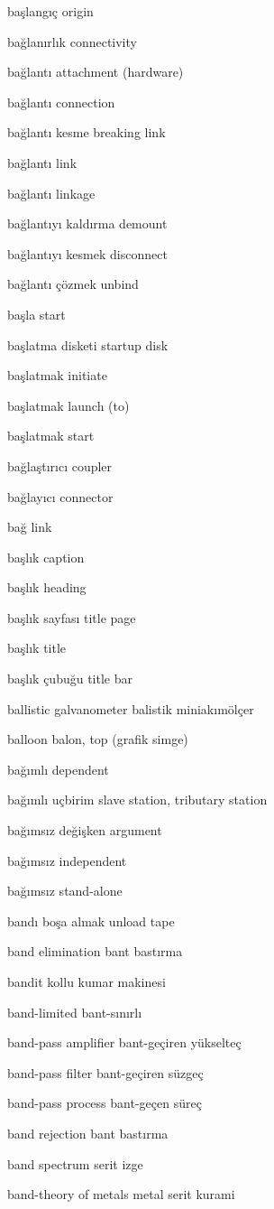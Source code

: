 \documentclass[12pt,fleqn]{article}\usepackage{../../common}
\begin{document}
başlangıç origin

bağlanırlık connectivity

bağlantı attachment (hardware)

bağlantı connection

bağlantı kesme breaking link

bağlantı link

bağlantı linkage

bağlantıyı kaldırma demount

bağlantıyı kesmek disconnect

bağlantı çözmek unbind

başla start

başlatma disketi startup disk

başlatmak initiate

başlatmak launch (to)

başlatmak start

bağlaştırıcı coupler

bağlayıcı connector

bağ link

başlık caption

başlık heading

başlık sayfası title page

başlık title

başlık çubuğu title bar

ballistic galvanometer balistik miniakımölçer

balloon balon, top (grafik simge)

bağımlı dependent

bağımlı uçbirim slave station, tributary station

bağımsız değişken argument

bağımsız independent

bağımsız stand-alone

bandı boşa almak unload tape

band elimination bant bastırma

bandit kollu kumar makinesi

band-limited bant-sınırlı

band-pass amplifier bant-geçiren yükselteç

band-pass filter bant-geçiren süzgeç

band-pass process bant-geçen süreç

band rejection bant bastırma

band spectrum serit izge

band-theory of metals metal serit kurami
\end{document}
